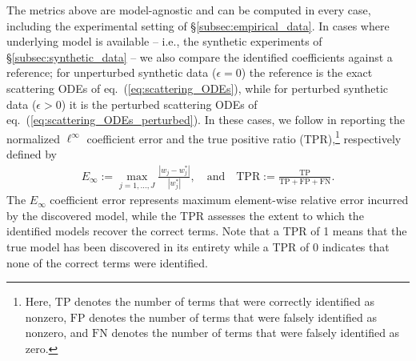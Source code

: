 \documentclass[journal=gmj]{CUP-JNL-DTM}%
\theoremstyle{definition}
\numberwithin{equation}{section}
\begin{document}
\smallskip

The metrics above are model-agnostic and can be computed in every case, including the experimental setting of \S\ref{subsec:empirical_data}. In cases where underlying model is available -- i.e., the synthetic experiments of \S\ref{subsec:synthetic_data} -- we also compare the identified coefficients against a reference; for unperturbed synthetic data ($\epsilon = 0$) the reference is the exact scattering ODEs of eq.~(\ref{eq:scattering_ODEs}), while for perturbed synthetic data ($\epsilon > 0$) it is the perturbed scattering ODEs of eq.~(\ref{eq:scattering_ODEs_perturbed}). In these cases, we follow \cite{Messenger.Bortz2021JournalofComputationalPhysics} in reporting the normalized $\ell^{\infty}$ coefficient error and the true positive ratio (TPR),\footnote{Here, $\text{TP}$ denotes the number of terms that were correctly identified as nonzero, $\text{FP}$ denotes the number of terms that were falsely identified as nonzero, and $\text{FN}$ denotes the number of terms that were falsely identified as zero.} respectively defined by \begin{align}\label{eq:Einfty_and_TPR}
    E_{\infty} := \max_{j=1,\dots,J} \frac{|w_j - w^*_j|}{|w^*_j|},
    \quad \text{and} \quad
    \text{TPR} := \frac{\text{TP}}{\text{TP} + \text{FP} + \text{FN}}.
\end{align} The $E_{\infty}$ coefficient error represents maximum element-wise relative error incurred by the discovered model, while the TPR assesses the extent to which the identified models recover the correct terms. Note that a TPR of 1 means that the true model has been discovered in its entirety while a TPR of 0 indicates that none of the correct terms were identified.
\end{document}
